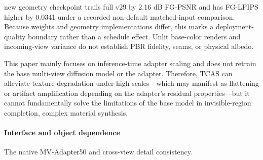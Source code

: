 \documentclass[times,twocolumn,final]{elsarticle}
\providecommand{\DIFadd}[1]{{\protect\color{blue} \sf #1}} %
\providecommand{\DIFdel}[1]{{\protect\color{red} \scriptsize #1}} %
\providecommand{\DIFaddbegin}{} %
\providecommand{\DIFaddend}{} %
\providecommand{\DIFdelbegin}{} %
\providecommand{\DIFdelend}{} %
\begin{document}

\DIFdelend \DIFaddbegin \DIFadd{new geometry checkpoint trails full v29 by 2.16 dB FG-PSNR and has FG-LPIPS higher by 0.0341 under a recorded non-default matched-input comparison. Because weights and geometry implementations differ, this marks a deployment-quality boundary rather than a schedule effect. Unlit base-color renders and incoming-view variance do not establish PBR fidelity, seams, or physical albedo.
}\DIFaddend

\DIFdelbegin \DIFdel{This paper mainly focuses on inference-time adapter scaling and does not retrain the base multi-view diffusion model or the adapter. Therefore, TCAS can alleviate texture degradation under high scales---which may manifest as flattening or artifact amplification depending on the adapter's residual properties---but it cannot fundamentally solve the limitations of the base model in invisible-region completion, complex material synthesis, }\DIFdelend \DIFaddbegin \paragraph{Interface and object dependence}
\DIFadd{The native MV-Adapter50 }\DIFaddend and \DIFdelbegin \DIFdel{cross-view detail consistency. }%
\end{document}
